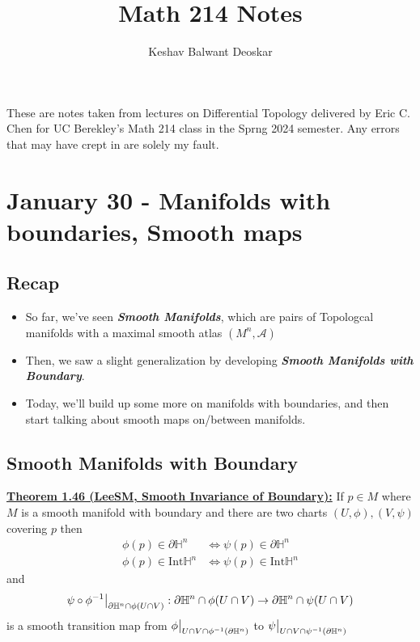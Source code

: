 \documentclass{article}
\title{Math 214 Notes}
\author{Keshav Balwant Deoskar}
\newcommand{\A}{\mathcal{A}}
\newcommand{\restr}[2]{{%
  \left.\kern-\nulldelimiterspace %
  #1 %
  \vphantom{\big|} %
  \right|_{#2} %
  }}
\begin{document}
\maketitle

These are notes taken from lectures on Differential Topology delivered by Eric C. Chen for UC Berekley's Math 214 class in the Sprng 2024 semester. Any errors that may have crept in are solely my fault.

\tableofcontents

\pagebreak

\section{January 30 - Manifolds with boundaries, Smooth maps}

\vskip 0.5cm
\subsection*{Recap}

\vskip 0.5cm
\begin{itemize}
  \item So far, we've seen \emph{\textbf{Smooth Manifolds}}, which are pairs of Topologcal manifolds with a maximal smooth atlas $(M^n, \A)$
  \item Then, we saw a slight generalization by developing \emph{\textbf{Smooth Manifolds with Boundary}}.
  \item Today, we'll build up some more on manifolds with boundaries, and then start talking about smooth maps on/between manifolds.
\end{itemize}

\vskip 1cm
\subsection{Smooth Manifolds with Boundary}

\vskip 0.5cm
\begin{dottedbox}
  \underline{\textbf{Theorem 1.46 (LeeSM, Smooth Invariance of Boundary):}} If $p \in M$ where $M$ is a smooth manifold with boundary and there are two charts $(U, \phi), (V, \psi)$ covering $p$ then
  \begin{align*}
    \phi(p) \in \partial \mathbb{H}^n &\iff \psi(p) \in \partial \mathbb{H}^n \\
    \phi(p) \in \text{Int} \mathbb{H}^n &\iff \psi(p) \in \text{Int} \mathbb{H}^n 
  \end{align*}
  and 
  \[ \restr{\psi \circ \phi^{-1}}{\partial \mathbb{H}^n \cap \phi(U \cap V)} : \partial \mathbb{H}^n \cap \phi(U \cap V) \rightarrow \partial \mathbb{H}^n \cap \psi(U \cap V) \]
  is a smooth transition map from $\restr{\phi}{U \cap V \cap \phi^{-1}(\partial \mathbb{H}^n)}$ to $\restr{\psi}{U \cap V \cap \psi^{-1}(\partial \mathbb{H}^n)}$
\end{dottedbox}
\end{document}
